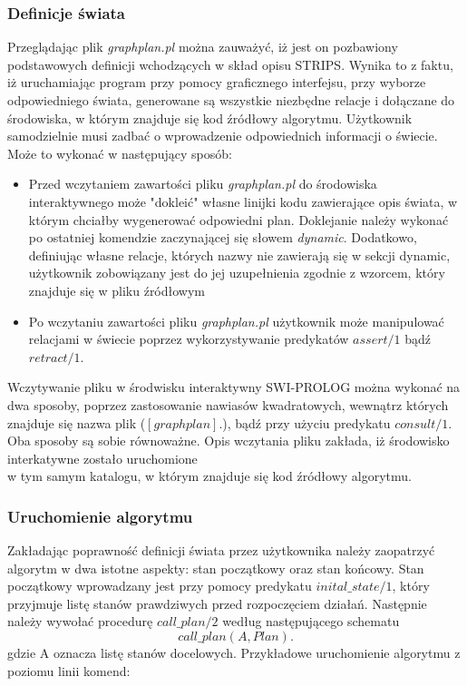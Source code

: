     \subsubsection{Definicje świata}
    Przeglądając plik \textit{graphplan.pl} można zauważyć, iż jest on pozbawiony podstawowych definicji wchodzących w skład opisu STRIPS. Wynika 
    to z faktu, iż uruchamiając program przy pomocy graficznego interfejsu, przy wyborze odpowiedniego świata, 
    generowane są wszystkie niezbędne relacje i dołączane do środowiska, w którym znajduje się kod źródłowy algorytmu.
    Użytkownik samodzielnie musi zadbać o wprowadzenie odpowiednich informacji o świecie. Może to wykonać w następujący sposób:
    \begin{itemize}
        \item Przed wczytaniem zawartości pliku \textit{graphplan.pl} do środowiska interaktywnego może "dokleić" własne linijki kodu 
        zawierające opis świata, w którym chciałby wygenerować odpowiedni plan. Doklejanie należy wykonać po ostatniej komendzie zaczynającej 
        się słowem \textit{dynamic}. Dodatkowo, definiując własne relacje, których nazwy nie zawierają się w sekcji dynamic, użytkownik 
        zobowiązany jest do jej uzupełnienia zgodnie z wzorcem, który znajduje się w pliku źródłowym
        \item Po wczytaniu zawartości pliku \textit{graphplan.pl} użytkownik może manipulować relacjami w świecie poprzez wykorzystywanie 
        predykatów $assert/1$ bądź $retract/1$. 
    \end{itemize}
    Wczytywanie pliku w środwisku interaktywny SWI-PROLOG można wykonać na dwa sposoby, poprzez zastosowanie nawiasów kwadratowych, wewnątrz których 
    znajduje się nazwa plik ($[graphplan].$), bądź przy użyciu predykatu $consult/1$. Oba sposoby są sobie równoważne. Opis wczytania pliku zakłada,
    iż środowisko interkatywne zostało uruchomione \\
    w tym samym katalogu, w którym znajduje się kod źródłowy algorytmu.
    \subsubsection{Uruchomienie algorytmu}
    Zakładając poprawność definicji świata przez użytkownika należy zaopatrzyć algorytm w dwa istotne aspekty: stan początkowy oraz stan końcowy. 
    Stan początkowy wprowadzany jest przy pomocy predykatu $inital\_state/1$, który przyjmuje listę stanów prawdziwych przed rozpoczęciem działań.
    Następnie należy wywołać procedurę $call\_plan/2$ według następującego schematu 
    \begin{equation}
        call\_plan(A,Plan).
    \end{equation}
    gdzie A oznacza listę stanów docelowych.
    Przykładowe uruchomienie algorytmu z poziomu linii komend:

